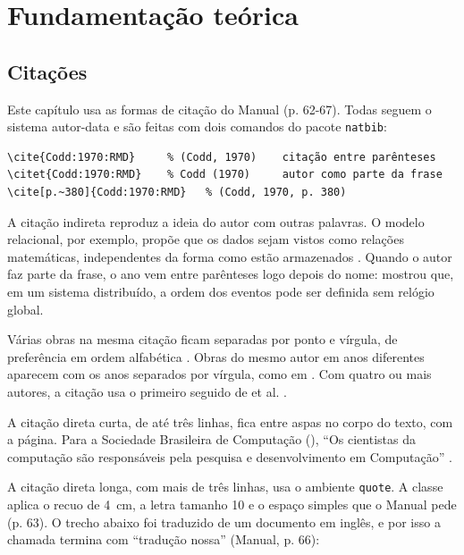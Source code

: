 \documentclass[tese,capa]{texufpel}
\begin{document}
\chapter{Fundamentação teórica}
\label{cap:fundamentacao}

\section{Citações}
\label{sec:citacoes}

Este capítulo usa as formas de citação do Manual (p. 62-67). Todas seguem o
sistema autor-data e são feitas com dois comandos do pacote \texttt{natbib}:

\begin{lstlisting}[language={[LaTeX]TeX}, numbers=none]
\cite{Codd:1970:RMD}     % (Codd, 1970)    citação entre parênteses
\citet{Codd:1970:RMD}    % Codd (1970)     autor como parte da frase
\cite[p.~380]{Codd:1970:RMD}   % (Codd, 1970, p. 380)
\end{lstlisting}

A citação indireta reproduz a ideia do autor com outras palavras. O modelo
relacional, por exemplo, propõe que os dados sejam vistos como relações
matemáticas, independentes da forma como estão armazenados
\citep{Codd:1970:RMD}. Quando o autor faz parte da frase, o ano vem entre
parênteses logo depois do nome: \citet{Lamport:1978:TCO} mostrou que, em um
sistema distribuído, a ordem dos eventos pode ser definida sem relógio
global.

Várias obras na mesma citação ficam separadas por ponto e vírgula, de
preferência em ordem alfabética \citep{Hoare:1969:ABC,Lamport:1978:TCO}.
Obras do mesmo autor em anos diferentes aparecem com os anos separados por
vírgula, como em \citet{Turing:1937:OCN,Turing:1950:CMI}. Com quatro ou mais
autores, a citação usa o primeiro seguido de et al. \citep{Cormen:2022:IA}.

A citação direta curta, de até três linhas, fica entre aspas no corpo do
texto, com a página. Para a Sociedade Brasileira de Computação
(), ``Os cientistas da
computação são responsáveis pela pesquisa e desenvolvimento em Computação''
\citep[p.~30]{Zorzo:2017:RFC}.

A citação direta longa, com mais de três linhas, usa o ambiente
\texttt{quote}. A classe aplica o recuo de 4~cm, a letra tamanho 10 e o espaço
simples que o Manual pede (p. 63). O trecho abaixo foi traduzido de um
documento em inglês, e por isso a chamada termina com ``tradução nossa''
(Manual, p. 66):
\end{document}
